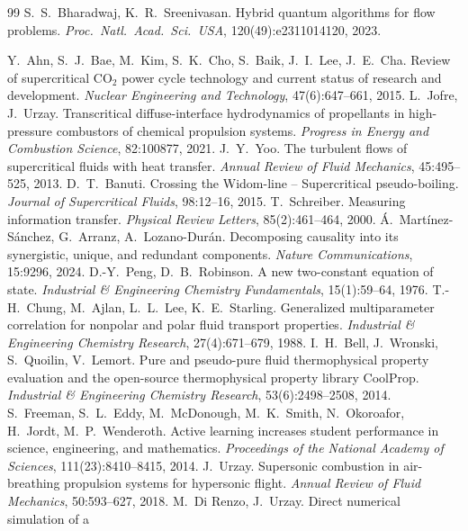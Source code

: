 \documentclass[11pt]{article}
\begin{document}
\begin{thebibliography}{99}
 S.\ S.\ Bharadwaj, K.\ R.\ Sreenivasan. Hybrid quantum algorithms for flow problems. \emph{Proc.\ Natl.\ Acad.\ Sci.\ USA}, 120(49):e2311014120, 2023.
 Y.\ Ahn, S.\ J.\ Bae, M.\ Kim, S.\ K.\ Cho, S.\ Baik, J.\ I.\ Lee, J.\ E.\ Cha.
Review of supercritical CO$_2$ power cycle technology and current status of research and
development. \emph{Nuclear Engineering and Technology}, 47(6):647--661, 2015.
 L.\ Jofre, J.\ Urzay. Transcritical diffuse-interface hydrodynamics
of propellants in high-pressure combustors of chemical propulsion systems. \emph{Progress
in Energy and Combustion Science}, 82:100877, 2021.
 J.\ Y.\ Yoo. The turbulent flows of supercritical fluids with heat
transfer. \emph{Annual Review of Fluid Mechanics}, 45:495--525, 2013.
 D.\ T.\ Banuti. Crossing the Widom-line -- Supercritical pseudo-boiling.
\emph{Journal of Supercritical Fluids}, 98:12--16, 2015.
 T.\ Schreiber. Measuring information transfer. \emph{Physical Review
Letters}, 85(2):461--464, 2000.
 \'A.\ Mart\'inez-S\'anchez, G.\ Arranz, A.\ Lozano-Dur\'an.
Decomposing causality into its synergistic, unique, and redundant components. \emph{Nature
Communications}, 15:9296, 2024.
 D.-Y.\ Peng, D.\ B.\ Robinson. A new two-constant equation of
state. \emph{Industrial \& Engineering Chemistry Fundamentals}, 15(1):59--64, 1976.
 T.-H.\ Chung, M.\ Ajlan, L.\ L.\ Lee, K.\ E.\ Starling. Generalized
multiparameter correlation for nonpolar and polar fluid transport properties.
\emph{Industrial \& Engineering Chemistry Research}, 27(4):671--679, 1988.
 I.\ H.\ Bell, J.\ Wronski, S.\ Quoilin, V.\ Lemort. Pure and
pseudo-pure fluid thermophysical property evaluation and the open-source thermophysical
property library CoolProp. \emph{Industrial \& Engineering Chemistry Research},
53(6):2498--2508, 2014.
 S.\ Freeman, S.\ L.\ Eddy, M.\ McDonough, M.\ K.\ Smith, N.\ Okoroafor,
H.\ Jordt, M.\ P.\ Wenderoth. Active learning increases student performance in science,
engineering, and mathematics. \emph{Proceedings of the National Academy of Sciences},
111(23):8410--8415, 2014.
 J.\ Urzay. Supersonic combustion in air-breathing propulsion systems for
hypersonic flight. \emph{Annual Review of Fluid Mechanics}, 50:593--627, 2018.
 M.\ Di Renzo, J.\ Urzay. Direct numerical simulation of a

\end{thebibliography}
\end{document}
